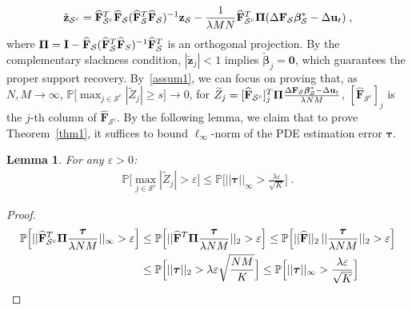 \documentclass[a4paper,11pt]{article}
\newcommand{\btau}{\bm{\tau}}
\newcommand{\bbeta}{\bm{\beta}}
\newcommand{\bF}{\mathbf{F}}
\newcommand{\mS}{\mathcal{S}}
\newcommand{\bu}{\mathbf{u}}
\newtheorem{lemma}{Lemma}[section]
\theoremstyle{definition}
\begin{document}
\begin{align}
\check{\mathbf{z}}_{\mS^c}=\widehat{\bF}_{\mS^c}^T\widehat{\bF}_\mS(\widehat{\bF}_{\mS}^T\widehat{\bF}_\mS)^{-1}\mathbf{z}_\mS-\frac{1}{\lambda MN}\widehat{\bF}_{\mS^c}^T{\bf{\Pi}}(\Delta \bF_\mS\bbeta_\mS^*-\Delta \bu_t)\;,\label{zSc}
\end{align}
where ${\bf{\Pi}}={\bf{I}}-\widehat{\bF}_\mS(\widehat{\bF}_\mS^T\widehat{\bF}_S)^{-1}\widehat{\bF}_\mS^T$ is an orthogonal projection. By the complementary slackness condition,  $|\check{\mathbf{z}}_j|< 1$ implies $\check{\bbeta}_j=\mathbf{0}$, which guarantees the proper support recovery. By~\eqref{assum1}, we can focus on proving that, as $N,M\to \infty$, $
\mathbb{P}\big[\max_{j\in \mS^c}|\widetilde{Z}_j|\geq s\big]\to 0$, for $\widetilde{Z}_j = [\widehat{\bF}_{\mS^c}]^T_j{\bf\Pi}\frac{\Delta \bF_\mS\bbeta_\mS^*-\Delta \bu_t}{\lambda NM}$, $[\widehat{\bF}_{\mS^c}]_j$ is the $j$-th column of $\widehat{\bF}_{\mS^c}$. By the following lemma, we claim that to prove Theorem~\ref{thm1}, it suffices to bound $\ell_\infty$-norm of the PDE estimation error $\btau$.
\begin{lemma}\label{Zlemma}
For any $\varepsilon>0$:
\begin{align}
\mathbb{P}\big[\max_{j\in \mS^c}|\widetilde{Z}_j|>\varepsilon\big]\leq  \mathbb{P}\Big[||\btau||_\infty>\frac{\lambda\varepsilon}{\sqrt{K}}\Big]\;.\label{ZlemmaBound}
\end{align}
\end{lemma}
\begin{proof}
	\begin{align*}
	\mathbb{P}\Big[||\widehat{\bF}_{\mS^c}^T{\bf\Pi}\frac{\btau}{\lambda NM}||_\infty>\varepsilon\Big]&\leq\mathbb{P}\Big[||\widehat{\bF}^T{\bf\Pi}\frac{\btau}{\lambda NM}||_2>\varepsilon\Big]
	\leq\mathbb{P}\Big[||\widehat{\bF}||_2\,||\frac{\btau}{\lambda NM}||_2>\varepsilon\Big]\\
	&\leq \mathbb{P}\Big[||\btau||_2>\lambda \varepsilon\sqrt{\frac{NM}{K}}\Big]\leq \mathbb{P}\Big[||\btau||_\infty>\frac{\lambda\varepsilon}{\sqrt{K}}\Big]
	\end{align*}
\end{proof}
\end{document}
